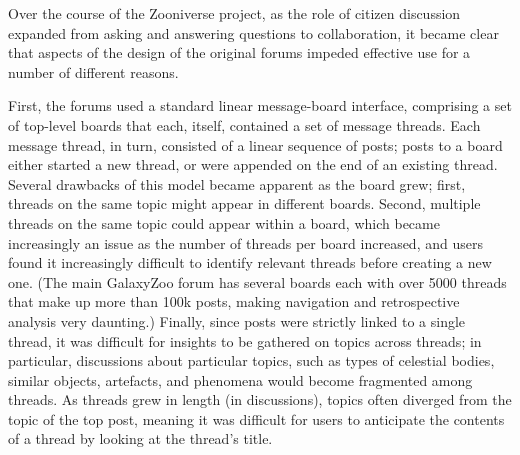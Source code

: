 \documentclass{sigchi}
\begin{document}


Over the course of the Zooniverse project, as the role of citizen discussion expanded from asking and answering questions to collaboration, it became clear that aspects of the design of the original forums impeded effective use for a number of different reasons.   

First, the forums used a standard linear message-board interface, comprising a set of top-level boards that each, itself, contained a set of message threads.  Each message thread, in turn, consisted of a linear sequence of posts; posts to a board either started a new thread, or were appended on the end of an existing thread.  Several drawbacks of this model became apparent as the board grew; first, threads on the same topic might appear in different boards.  Second, multiple threads on the same topic could appear within a board, which became increasingly an issue as the number of threads per board increased, and users found it increasingly difficult to identify relevant threads before creating a new one. (The main GalaxyZoo forum has several boards each with over 5000 threads that make up more than 100k posts, making navigation and retrospective analysis very daunting.)  Finally, since posts were strictly linked to a single thread, it was difficult for insights to be gathered on topics across threads; in particular, discussions about particular topics, such as types of celestial bodies, similar objects, artefacts, and phenomena would become fragmented among threads.  As threads grew in length (in discussions), topics often diverged from the topic of the top post, meaning it was difficult for users to anticipate the contents of a thread by looking at the thread's title.  
\end{document}
